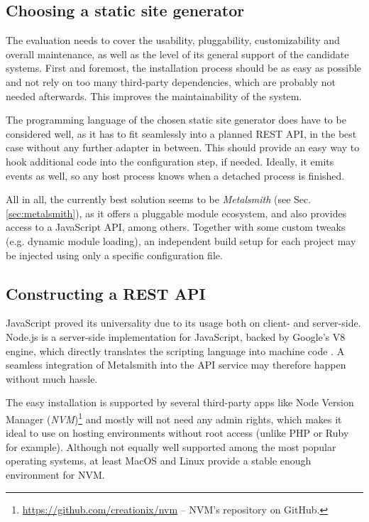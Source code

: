 \subsection{Choosing a static site generator}
\label{sec:primarythoughts-generator}

The evaluation needs to cover the usability, pluggability, customizability and overall maintenance, as well as the level of its general support of the candidate systems. First and foremost, the installation process should be as easy as possible and not rely on too many third-party dependencies, which are probably not needed afterwards. This improves the maintainability of the system.

The programming language of the chosen static site generator does have to be considered well, as it has to fit seamlessly into a planned REST API, in the best case without any further adapter in between. This should provide an easy way to hook additional code into the configuration step, if needed. Ideally, it emits events as well, so any host process knows when a detached process is finished.

All in all, the currently best solution seems to be \emph{Metalsmith} (see Sec. \ref{sec:metalsmith}), as it offers a pluggable module ecosystem, and also provides access to a JavaScript API, among others. Together with some custom tweaks (e.g. dynamic module loading), an independent build setup for each project may be injected using only a specific configuration file.


\subsection{Constructing a REST API}
\label{sec:primarythoughts-restapi}

JavaScript proved its universality due to its usage both on client- and server-side. Node.js is a server-side implementation for JavaScript, backed by Google's V8 engine, which directly translates the scripting language into machine code \cite[4]{cantelon2017node}. A seamless integration of Metalsmith into the API service may therefore happen without much hassle.

The easy installation is supported by several third-party apps like Node Version Manager (\emph{NVM})\footnote{\url{https://github.com/creationix/nvm} -- NVM's repository on GitHub.} and mostly will not need any admin rights, which makes it ideal to use on hosting environments without root access (unlike PHP or Ruby for example). Although not equally well supported among the most popular operating systems, at least MacOS and Linux provide a stable enough environment for NVM.

